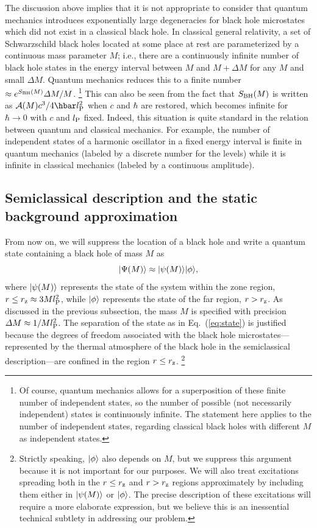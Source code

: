\documentclass[12pt]{article}
\begin{document}
The discussion above implies that it is not appropriate to consider 
that quantum mechanics introduces exponentially large degeneracies 
for black hole microstates which did not exist in a classical black 
hole.  In classical general relativity, a set of Schwarzschild 
black holes located at some place at rest are parameterized by 
a continuous mass parameter $M$; i.e., there are a continuously 
infinite number of black hole states in the energy interval between 
$M$ and $M + \varDelta M$ for any $M$ and small $\varDelta M$. 
Quantum mechanics reduces this to a finite number $\approx 
e^{S_{\rm BH}(M)} \varDelta M/M$.%
\footnote{Of course, quantum mechanics allows for a superposition of 
 these finite number of independent states, so the number of possible 
 (not necessarily independent) states is continuously infinite.  The 
 statement here applies to the number of independent states, regarding 
 classical black holes with different $M$ as independent states.}
This can also be seen from the fact that $S_{\rm BH}(M)$ is written 
as ${\cal A}(M) c^3/4 \hbar l_{\rm P}^2$ when $c$ and $\hbar$ are 
restored, which becomes infinite for $\hbar \rightarrow 0$ with $c$ 
and $l_{\rm P}$ fixed.  Indeed, this situation is quite standard in 
the relation between quantum and classical mechanics.  For example, 
the number of independent states of a harmonic oscillator in a fixed 
energy interval is finite in quantum mechanics (labeled by a discrete 
number for the levels) while it is infinite in classical mechanics 
(labeled by a continuous amplitude).


\subsection{Semiclassical description and the static background 
 approximation}
\label{subsec:static}

From now on, we will suppress the location of a black hole and write 
a quantum state containing a black hole of mass $M$ as
%
\begin{equation}
  \ket{\Psi(M)} \approx \ket{\psi(M)} \ket{\phi},
\label{eq:state}
\end{equation}
%
where $| \psi(M) \rangle$ represents the state of the system within 
the zone region, $r \leq r_{\rm z} \approx 3 M l_{\rm P}^2$, while 
$| \phi \rangle$ represents the state of the far region, $r > r_{\rm z}$. 
As discussed in the previous subsection, the mass $M$ is specified 
with precision $\varDelta M \approx 1/M l_{\rm P}^2$.  The 
separation of the state as in Eq.~(\ref{eq:state}) is justified 
because the degrees of freedom associated with the black hole 
microstates---represented by the thermal atmosphere of the black 
hole in the semiclassical description---are confined in the region 
$r \leq r_{\rm z}$.%
\footnote{Strictly speaking, $| \phi \rangle$ also depends on $M$, 
 but we suppress this argument because it is not important for 
 our purposes.  We will also treat excitations spreading both in 
 the $r \leq r_{\rm z}$ and $r > r_{\rm z}$ regions approximately 
 by including them either in $| \psi(M) \rangle$ or $| \phi \rangle$. 
 The precise description of these excitations will require a 
 more elaborate expression, but we believe this is an inessential 
 technical subtlety in addressing our problem.}
\end{document}
